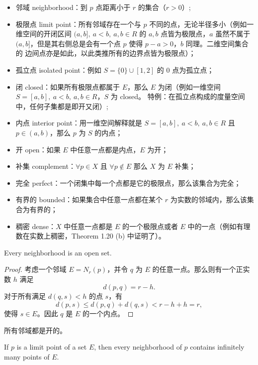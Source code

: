 \documentclass[../poma-notes.tex]{subfiles}
\begin{document}
\begin{anote}
  \begin{itemize}
    \item 邻域 neighborhood：到 $p$ 点距离小于 $r$ 的集合（$r>0$）;
    \item 极限点 limit point：所有邻域存在一个与 $p$ 不同的点，无论半径多小（例如一维空间的开闭区间 $(a,b],\ a<b, \ a,b \in R$
          的 $a,b$ 点皆为极限点，$a$ 虽然不属于 $(a,b]$，但是其右侧总是会有一个点 $p$ 使得 $p-a>0$，$b$ 同理。二维空间集合的
          边间点亦是如此，以此类推所有的边界点皆为极限点）；
    \item 孤立点 isolated point：例如 $S = \{0\} \cup [1,2]$ 的 0 点为孤立点；
    \item 闭 closed：如果所有极限点都属于 $E$，那么 $E$ 为闭（例如一维空间 $S=[a,b],\ a<b, \ a,b \in R$，$S$ 为 closed。
          特例：在孤立点构成的度量空间中，任何子集都是即开又闭）;
    \item 内点 interior point：用一维空间解释就是 $S=[a,b],\ a<b,\ a,b \in R$ 且 $p \in (a,b)$，那么 $p$ 为 $S$ 的内点；
    \item 开 open：如果 $E$ 中任意一点都是内点，$E$ 为开；
    \item 补集 complement：$\forall p \in X$ 且 $\forall p \notin E$ 那么 $X$ 为 $E$ 补集；
    \item 完全 perfect：一个闭集中每一个点都是它的极限点，那么该集合为完全；
    \item 有界的 bounded：如果集合中任意一点都在某个 $r$ 为实数的邻域内，那么该集合为有界的；
    \item 稠密 dense：$X$ 中任意一点都是 $E$ 的一个极限点或者 $E$ 中的一点（例如有理数在实数上稠密，Theorem 1.20 (b) 中证明了）。
  \end{itemize}
\end{anote}

\begin{theorem}
  Every neighborhood is an open set.
\end{theorem}

\begin{proof}
  考虑一个邻域 $E = N_r(p)$，并令 $q$ 为 $E$ 的任意一点。那么则有一个正实数 $h$ 满足
  \[d(p,q)=r-h.\]
  对于所有满足 $d(q,s)<h$ 的点 $s$，有
  \[d(p,s) \le d(p,q) + d(q,s) < r - h + h = r,\]
  使得 $s \in E$。因此 $q$ 是 $E$ 的一个内点。
\end{proof}

\anote 所有邻域都是开的。

\begin{theorem}
  If $p$ is a limit point of a set $E$, then every neighborhood of $p$ contains infinitely many points of $E$.
\end{theorem}
\end{document}
